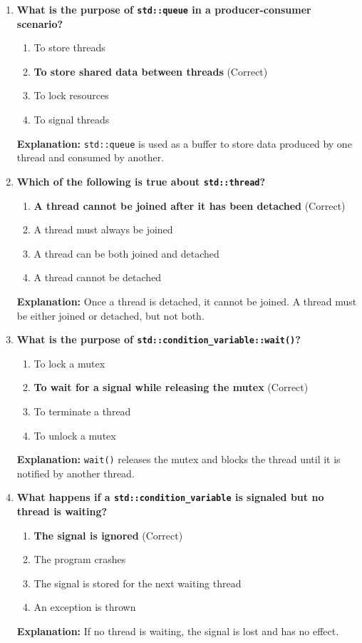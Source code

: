 \documentclass[12pt]{article}
\begin{document}
\begin{enumerate}
    \item \textbf{What is the purpose of \texttt{std::queue} in a producer-consumer scenario?}
    \begin{enumerate}[label=(\alph*)]
        \item To store threads
        \item \textbf{To store shared data between threads} (Correct)
        \item To lock resources
        \item To signal threads
    \end{enumerate}
    \textbf{Explanation:} \texttt{std::queue} is used as a buffer to store data produced by one thread and consumed by another.

    \item \textbf{Which of the following is true about \texttt{std::thread}?}
    \begin{enumerate}[label=(\alph*)]
        \item \textbf{A thread cannot be joined after it has been detached} (Correct)
        \item A thread must always be joined
        \item A thread can be both joined and detached
        \item A thread cannot be detached
    \end{enumerate}
    \textbf{Explanation:} Once a thread is detached, it cannot be joined. A thread must be either joined or detached, but not both.

    \item \textbf{What is the purpose of \texttt{std::condition\_variable::wait()}?}
    \begin{enumerate}[label=(\alph*)]
        \item To lock a mutex
        \item \textbf{To wait for a signal while releasing the mutex} (Correct)
        \item To terminate a thread
        \item To unlock a mutex
    \end{enumerate}
    \textbf{Explanation:} \texttt{wait()} releases the mutex and blocks the thread until it is notified by another thread.

    \item \textbf{What happens if a \texttt{std::condition\_variable} is signaled but no thread is waiting?}
    \begin{enumerate}[label=(\alph*)]
        \item \textbf{The signal is ignored} (Correct)
        \item The program crashes
        \item The signal is stored for the next waiting thread
        \item An exception is thrown
    \end{enumerate}
    \textbf{Explanation:} If no thread is waiting, the signal is lost and has no effect.


\end{enumerate}
\end{document}
